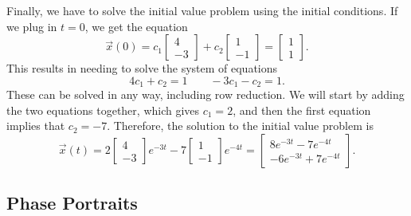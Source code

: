\begin{exampleSol}
Finally, we have to solve the initial value problem using the initial conditions. If we plug in $t=0$, we get the equation
\begin{equation*}
\vec{x}(0) = c_1 \begin{bmatrix} 4 \\ -3 \end{bmatrix} + c_2 \begin{bmatrix} 1 \\ -1 \end{bmatrix} = \begin{bmatrix} 1 \\ 1 \end{bmatrix}.
\end{equation*}
This results in needing to solve the system of equations
\begin{equation*}
4c_1 + c_2 = 1 \qquad -3c_1 - c_2 = 1.
\end{equation*}
These can be solved in any way, including row reduction. We will start by adding the two equations together, which gives $c_1 = 2$, and then the first equation implies that $c_2 = -7$. Therefore, the solution to the initial value problem is
\begin{equation*}
\vec{x}(t) = 2 \begin{bmatrix} 4 \\ -3 \end{bmatrix}e^{-3t}  - 7 \begin{bmatrix} 1 \\ -1 \end{bmatrix}e^{-4t} = \begin{bmatrix} 8e^{-3t} - 7e^{-4t} \\ -6e^{-3t} + 7e^{-4t} \end{bmatrix}.
\end{equation*}
\end{exampleSol}

\subsection{Phase Portraits}

